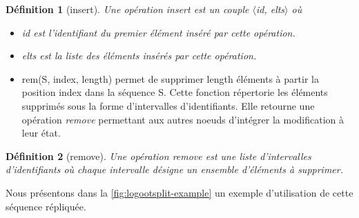 \documentclass[12pt]{thesul}
\newtheorem{definition}{Définition}
\begin{document}
\begin{definition}[insert]
  Une opération \emph{insert} est un couple $\langle$id, elts$\rangle$ où
  \begin{itemize}
    \item id est l'identifiant du premier élément inséré par cette opération.
    \item elts est la liste des éléments insérés par cette opération.
  \end{itemize}
\end{definition}

\begin{itemize}
  \item rem(S, index, length) permet de supprimer length éléments à partir la position index dans la séquence S.
  Cette fonction répertorie les éléments supprimés sous la forme d'intervalles d'identifiants.
  Elle retourne une opération \emph{remove} permettant aux autres noeuds d'intégrer la modification à leur état.
\end{itemize}

\begin{definition}[remove]
  Une opération \emph{remove} est une liste d'intervalles d'identifiants où chaque intervalle désigne un ensemble d'éléments à supprimer.
\end{definition}

Nous présentons dans la \autoref{fig:logootsplit-example} un exemple d'utilisation de cette séquence répliquée.
\end{document}
